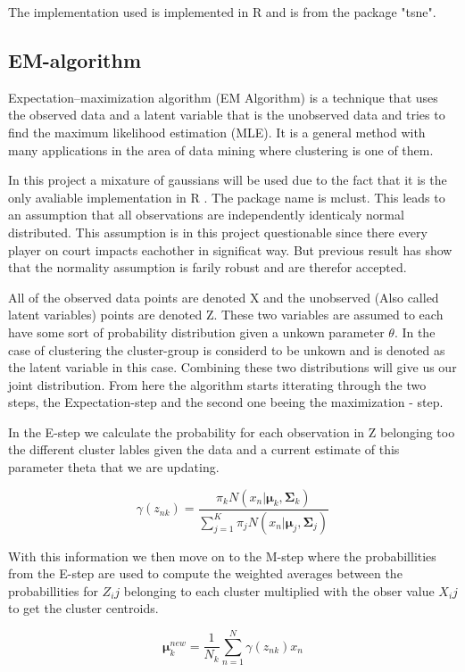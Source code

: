 \documentclass{article}
\begin{document}
The implementation used is implemented in R and is from the package "tsne". 



\subsection{EM-algorithm}

Expectation–maximization algorithm  (EM Algorithm) is a technique that uses the observed data and a latent variable that is the unobserved data and tries to find the maximum likelihood estimation (MLE). It is a general method with many applications in the area of data mining where clustering is one of them.

In this project a mixature of gaussians will be used due to the fact that it is the only avaliable implementation in R . The package name is mclust. This leads to an assumption that all observations are independently identicaly normal distributed. This assumption is in this project questionable since there every player on court impacts eachother in significat way.  But previous result has show that the normality assumption is farily robust and are therefor accepted. 

All of the observed data points are denoted X and the unobserved (Also called latent variables) points are denoted Z. These two variables are assumed to each have some sort of probability distribution given a unkown parameter $\theta$. In the case of clustering the cluster-group is considerd to be unkown and is denoted as the latent variable in this case.  Combining these two distributions will give us our joint distribution. From here the algorithm starts itterating through the two steps, the Expectation-step and the second one beeing the maximization - step.


In the E-step we calculate the probability for each observation in Z belonging too the different cluster lables given the data and a current estimate of this parameter theta that we are updating.

$$\gamma(z_{nk}) = \frac{\pi_k N(x_n|\mathbf{\mu}_k,\mathbf{\Sigma}_k)} {\sum_{j=1}^{K}  \pi_jN(x_n|\mathbf{\mu}_j,\mathbf{\Sigma}_j)}$$

With this information we then move on to the M-step where the probabillities from the E-step are used to compute the weighted averages between the probabillities for $Z_ij$ belonging to each cluster multiplied with the obser value $X_ij$ to get the cluster centroids. 

$$\mathbf{\mu}_k^{new} = \frac{1}{N_k} \sum_{n=1}^N\gamma(z_{nk})x_n$$
\end{document}
